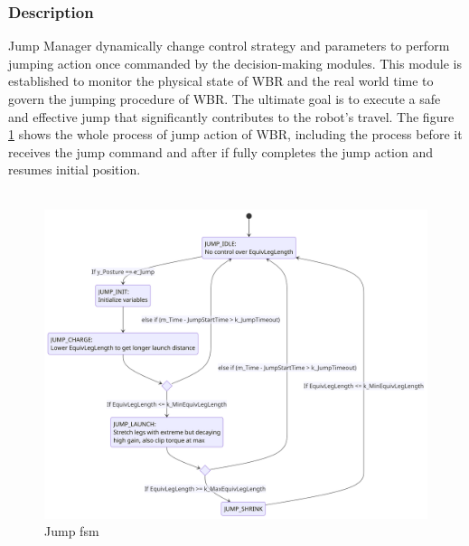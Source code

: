\documentclass[12pt]{article}
\begin{document}
        \subsubsection{Description}
            Jump Manager dynamically change control strategy and parameters to perform jumping action once commanded by the decision-making modules. This module is established to monitor the physical state of WBR and the real world time to govern the jumping procedure of WBR. The ultimate goal is to execute a safe and effective jump that significantly contributes to the robot's travel. The figure \ref{fig:Jump FSM} shows the whole process of jump action of WBR, including the process before it receives the jump command and after if fully completes the jump action and resumes initial position.\\\\
            \begin{figure}[H]
                \centering
                \includegraphics[width=\textwidth,height=\textheight,keepaspectratio]{../Jump FSM.png}
                \caption{Jump \acrshort{fsm}}
                \label{fig:Jump FSM}
            \end{figure}
\end{document}
